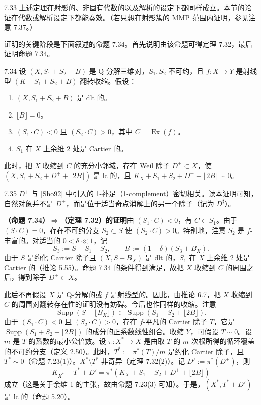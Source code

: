 \begin{remark}{7.33}
上述定理在射影的、非固有代数的以及解析的设定下都同样成立。本节的论证在代数或解析设定下都能奏效。（若只想在射影簇的 MMP 范围内证明，参见注意 7.37。）
\end{remark}

证明的关键阶段是下面叙述的命题 7.34。首先说明由该命题可得定理 7.32，最后证明命题 7.34。

\begin{proposition*}{7.34}
设 $(X,S_1+S_2+B)$ 是 Q-分解三维对，$S_1,S_2$ 不可约，且 $f\colon X\to Y$ 是射线型 $(K+S_1+S_2+B)$-翻转收缩。假设：
\begin{enumerate}[label=(\arabic*),leftmargin=2.4em,itemsep=1pt,topsep=2pt,parsep=0pt]
\item $(X,S_1+S_2+B)$ 是 dlt 的。
\item $\lfloor B\rfloor=0$。
\item $(S_1\cdot C)<0$ 且 $(S_2\cdot C)>0$，其中 $C=\operatorname{Ex}(f)$。
\item $S_1$ 在 $X$ 上余维 2 处是 Cartier 的。
\end{enumerate}
此时，把 $X$ 收缩到 $C$ 的充分小邻域，存在 Weil 除子 $D^+\subset X$，使 $(X,S_1+S_2+D^++\lfloor 2B\rfloor)$ 是 lc 的，且 $K_X+S_1+S_2+D^++\lfloor 2B\rfloor\sim0$。
\end{proposition*}

\begin{remark}{7.35}
$D^+$ 与 [Sho92] 中引入的 1-补足（1-complement）密切相关。读本证明可知，自然对象并不是 $D^+$，而是位于适当奇点消解上的另一个除子（记为 $D^\sharp$）。
\end{remark}

\par\medskip\noindent\textbf{（命题 7.34）$\Rightarrow$（定理 7.32）的证明}\quad 由 $(S_1\cdot C)<0$，有 $C\subset S_1$。由于 $(S\cdot C)=0$，存在不可约分支 $S_2\subset S$ 使 $(S_2\cdot C)>0$。特别地，注意 $S_2$ 是 $f$-丰富的。对适当的 $0<\delta\ll1$，记
\[
S_3:=S-S_1-S_2,\qquad B:=(1-\delta)(S_3+B_X).
\]
由于 $S$ 是约化 Cartier 除子且 $(X,S+B_X)$ 是 dlt 的，$S_1$ 在 $X$ 上余维 2 处是 Cartier 的（推论 5.55）。命题 7.34 的条件得到满足，故把 $X$ 收缩到 $C$ 的周围之后，得到除子 $D^+\subset X$。

此后不再假设 $X$ 是 Q-分解的或 $f$ 是射线型的。因此，由推论 6.7，把 $X$ 收缩到 $C$ 的周围对翻转存在性的证明没有妨碍。今后也作同样的收缩。注意
\[
\operatorname{Supp}(S+\lfloor B_X\rfloor)\subset\operatorname{Supp}(S_1+S_2+\lfloor 2B\rfloor).
\]
由于 $(S_1\cdot C)<0$ 且 $(S_2\cdot C)>0$，存在 $f$-平凡的 Cartier 除子 $T$，它是 $\operatorname{Supp}(S_1+S_2+\lfloor 2B\rfloor)$ 的成分的正系数线性组合。收缩 $Y$，可假设 $T\sim0$。设 $m$ 是 $T$ 的系数的最小公倍数。设 $\pi\colon X^*\to X$ 是由取 $T$ 的 $m$ 次根所得的循环覆盖的不可约分支（定义 2.50）。此时，$T^*:=\pi^*(T)/m$ 是约化 Cartier 除子，且 $T^*\sim0$（命题 7.23(1)）。$X^*\setminus T^*$ 非奇异（定理 7.32(2)）。记 $D':=\pi^*(D^+)$，则
\[
K_{X^*}+T^*+D'=\pi^*(K_X+S_1+S_2+D^++\lfloor 2B\rfloor)
\]
成立（这是关于余维 1 的主张，故由命题 7.23(3) 可知）。于是，$(X^*,T^*+D')$ 是 lc 的（命题 5.20）。

